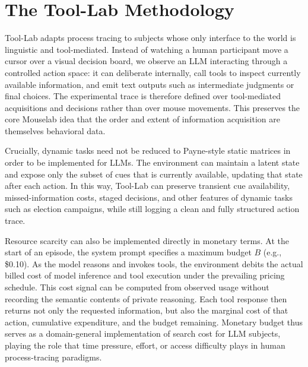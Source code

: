 \section{The Tool-Lab Methodology}

Tool-Lab adapts process tracing to subjects whose only interface to the world is
linguistic and tool-mediated. Instead of watching a human participant move a
cursor over a visual decision board, we observe an LLM interacting through a
controlled action space: it can deliberate internally, call tools to inspect
currently available information, and emit text outputs such as intermediate
judgments or final choices. The experimental trace is therefore defined over
tool-mediated acquisitions and decisions rather than over mouse movements.
This preserves the core Mouselab idea that the order and extent of information
acquisition are themselves behavioral data.

Crucially, dynamic tasks need not be reduced to Payne-style static matrices in
order to be implemented for LLMs. The environment can maintain a latent state
and expose only the subset of cues that is currently available, updating that
state after each action. In this way, Tool-Lab can preserve transient cue
availability, missed-information costs, staged decisions, and other features of
dynamic tasks such as election campaigns, while still logging a clean and fully
structured action trace.

Resource scarcity can also be implemented directly in monetary terms. At the
start of an episode, the system prompt specifies a maximum budget $B$ (e.g.,
\$0.10). As the model reasons and invokes tools, the environment debits the
actual billed cost of model inference and tool execution under the prevailing
pricing schedule. This cost signal can be computed from observed usage without
recording the semantic contents of private reasoning. Each tool response then
returns not only the requested information, but also the marginal cost of that
action, cumulative expenditure, and the budget remaining. Monetary budget thus
serves as a domain-general implementation of search cost for LLM subjects,
playing the role that time pressure, effort, or access difficulty plays in
human process-tracing paradigms.
